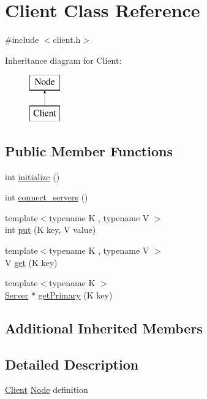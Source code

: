 \hypertarget{classClient}{}\section{Client Class Reference}
\label{classClient}


{\ttfamily \#include $<$client.\+h$>$}

Inheritance diagram for Client\+:\begin{figure}[H]
\begin{center}
\leavevmode
\includegraphics[height=2.000000cm]{classClient}
\end{center}
\end{figure}
\subsection*{Public Member Functions}
\begin{DoxyCompactItemize}
\item 
int \mbox{\hyperlink{classClient_a5de857af6e3c568925ecd342314617d7}{initialize}} ()
\item 
int \mbox{\hyperlink{classClient_a90a2db07daa07b38544fe3724520f4da}{connect\+\_\+servers}} ()
\item 
{\footnotesize template$<$typename K , typename V $>$ }\\int \mbox{\hyperlink{classClient_aaa4866468879b4e1f6905756191e20d1}{put}} (K key, V value)
\item 
{\footnotesize template$<$typename K , typename V $>$ }\\V \mbox{\hyperlink{classClient_a12d1464831984d5d90358a2abb75f405}{get}} (K key)
\item 
{\footnotesize template$<$typename K $>$ }\\\mbox{\hyperlink{classServer}{Server}} $\ast$ \mbox{\hyperlink{classClient_aab8dfc8e80e752a5f0c1feac7d7ec163}{get\+Primary}} (K key)
\end{DoxyCompactItemize}
\subsection*{Additional Inherited Members}


\subsection{Detailed Description}
\mbox{\hyperlink{classClient}{Client}} \mbox{\hyperlink{classNode}{Node}} definition 

